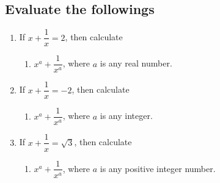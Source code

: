 \documentclass[12pt,a4paper,twoside]{book}
\begin{document}
	\subsection{Evaluate the followings}
		\begin{enumerate}
			\item If $x+\dfrac{1}{x}= 2$, then calculate \begin{enumerate}[label=(\alph*)]
				\item $x^a+\dfrac{1}{x^a}$, where $a$ is any real number.
			\end{enumerate} 
			\item If $x+\dfrac{1}{x}= -2$, then calculate \begin{enumerate}[label=(\alph*)]
				\item $x^a+\dfrac{1}{x^a}$, where $a$ is any integer.
			\end{enumerate} 
			\item If $x+\dfrac{1}{x}= \sqrt{3}$, then calculate \begin{enumerate}[label=(\alph*)]
				\item $x^a+\dfrac{1}{x^a}$, where $a$ is any positive integer number.
				

\end{enumerate}
\end{enumerate}
\end{document}
